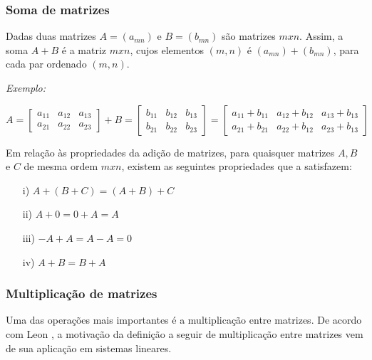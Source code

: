 \subsubsection{Soma de matrizes}
\noindent Dadas duas matrizes $A = (a{}_{mn})$ e $B = (b{}_{mn}) $ são matrizes $m x n$. Assim, a soma $A + B$ é a matriz $m x n$, cujos elementos $(m, n)$ é $(a{}_{mn}) + (b{}_{mn})$, para cada par ordenado $(m, n)$.

\textit{Exemplo:}
\begin{center}
    $A =
    \begin{bmatrix}
        a{}_{11} & a{}_{12} & a{}_{13} \\ 
        a{}_{21} & a{}_{22} & a{}_{23} 
    \end{bmatrix}
    + B =
    \begin{bmatrix}
        b{}_{11} & b{}_{12} & b{}_{13} \\ 
        b{}_{21} & b{}_{22} & b{}_{23}
    \end{bmatrix}
    =
    \begin{bmatrix}
        a{}_{11} + b{}_{11} & a{}_{12} + b{}_{12} & a{}_{13} + b{}_{13} \\ 
        a{}_{21} + b{}_{21} & a{}_{22} + b{}_{12} & a{}_{23} + b{}_{13}
    \end{bmatrix}$
\end{center}

Em relação às propriedades da adição de matrizes, para quaisquer matrizes $A, B$ e $C$ de mesma ordem $m x n$, existem as seguintes propriedades que a satisfazem:

\begin{enumerate}
    \item[i)] $A + (B + C) = (A + B) + C$
    \item[ii)] $A + 0 = 0 + A = A$
    \item[iii)] $-A + A = A - A = 0$
    \item[iv)] $A + B = B + A$
\end{enumerate}

\subsubsection{Multiplicação de matrizes}
\noindent Uma das operações mais importantes é a multiplicação entre matrizes. De acordo com Leon \cite{1998:Leon}, a motivação da definição a seguir de multiplicação entre matrizes vem de sua aplicação em sistemas lineares.

